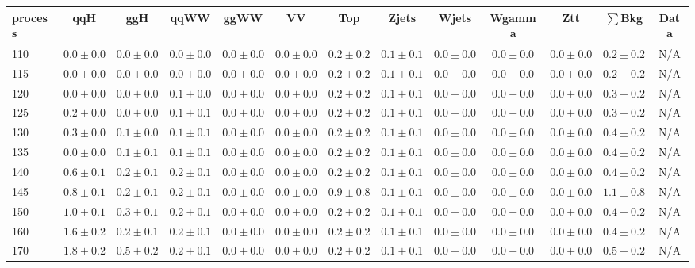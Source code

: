\begin{table}
{%
 \tiny
 \begin{center}
 \begin{tabular}{l | c c | c c c c c c c c  | c c}
 \hline
 process & qqH & ggH & qqWW & ggWW & VV & Top & Zjets & Wjets & Wgamma & Ztt & $\sum$Bkg & Data \\
 \hline
110 & $0.0\pm0.0$ & $0.0\pm0.0$ & $0.0\pm0.0$ & $0.0\pm0.0$ & $0.0\pm0.0$ & $0.2\pm0.2$ & $0.1\pm0.1$ & $0.0\pm0.0$ & $0.0\pm0.0$ & $0.0\pm0.0$ & $0.2\pm0.2$ & N/A \\
115 & $0.0\pm0.0$ & $0.0\pm0.0$ & $0.0\pm0.0$ & $0.0\pm0.0$ & $0.0\pm0.0$ & $0.2\pm0.2$ & $0.1\pm0.1$ & $0.0\pm0.0$ & $0.0\pm0.0$ & $0.0\pm0.0$ & $0.2\pm0.2$ & N/A \\
120 & $0.0\pm0.0$ & $0.0\pm0.0$ & $0.1\pm0.0$ & $0.0\pm0.0$ & $0.0\pm0.0$ & $0.2\pm0.2$ & $0.1\pm0.1$ & $0.0\pm0.0$ & $0.0\pm0.0$ & $0.0\pm0.0$ & $0.3\pm0.2$ & N/A \\
125 & $0.2\pm0.0$ & $0.0\pm0.0$ & $0.1\pm0.1$ & $0.0\pm0.0$ & $0.0\pm0.0$ & $0.2\pm0.2$ & $0.1\pm0.1$ & $0.0\pm0.0$ & $0.0\pm0.0$ & $0.0\pm0.0$ & $0.3\pm0.2$ & N/A \\
130 & $0.3\pm0.0$ & $0.1\pm0.0$ & $0.1\pm0.1$ & $0.0\pm0.0$ & $0.0\pm0.0$ & $0.2\pm0.2$ & $0.1\pm0.1$ & $0.0\pm0.0$ & $0.0\pm0.0$ & $0.0\pm0.0$ & $0.4\pm0.2$ & N/A \\
135 & $0.0\pm0.0$ & $0.1\pm0.1$ & $0.1\pm0.1$ & $0.0\pm0.0$ & $0.0\pm0.0$ & $0.2\pm0.2$ & $0.1\pm0.1$ & $0.0\pm0.0$ & $0.0\pm0.0$ & $0.0\pm0.0$ & $0.4\pm0.2$ & N/A \\
140 & $0.6\pm0.1$ & $0.2\pm0.1$ & $0.2\pm0.1$ & $0.0\pm0.0$ & $0.0\pm0.0$ & $0.2\pm0.2$ & $0.1\pm0.1$ & $0.0\pm0.0$ & $0.0\pm0.0$ & $0.0\pm0.0$ & $0.4\pm0.2$ & N/A \\
145 & $0.8\pm0.1$ & $0.2\pm0.1$ & $0.2\pm0.1$ & $0.0\pm0.0$ & $0.0\pm0.0$ & $0.9\pm0.8$ & $0.1\pm0.1$ & $0.0\pm0.0$ & $0.0\pm0.0$ & $0.0\pm0.0$ & $1.1\pm0.8$ & N/A \\
150 & $1.0\pm0.1$ & $0.3\pm0.1$ & $0.2\pm0.1$ & $0.0\pm0.0$ & $0.0\pm0.0$ & $0.2\pm0.2$ & $0.1\pm0.1$ & $0.0\pm0.0$ & $0.0\pm0.0$ & $0.0\pm0.0$ & $0.4\pm0.2$ & N/A \\
160 & $1.6\pm0.2$ & $0.2\pm0.1$ & $0.2\pm0.1$ & $0.0\pm0.0$ & $0.0\pm0.0$ & $0.2\pm0.2$ & $0.1\pm0.1$ & $0.0\pm0.0$ & $0.0\pm0.0$ & $0.0\pm0.0$ & $0.4\pm0.2$ & N/A \\
170 & $1.8\pm0.2$ & $0.5\pm0.2$ & $0.2\pm0.1$ & $0.0\pm0.0$ & $0.0\pm0.0$ & $0.2\pm0.2$ & $0.1\pm0.1$ & $0.0\pm0.0$ & $0.0\pm0.0$ & $0.0\pm0.0$ & $0.5\pm0.2$ & N/A \\

\end{tabular}
\end{center}}
\end{table}
